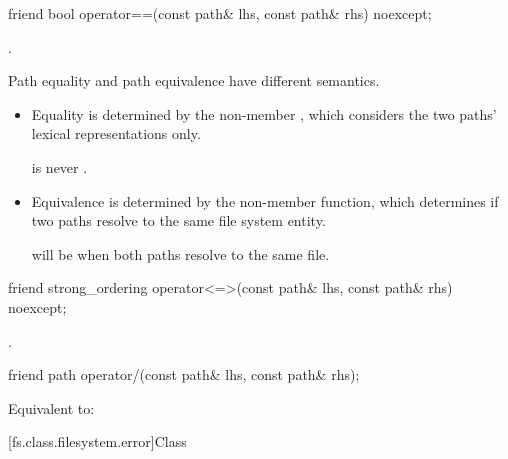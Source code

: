 %
\begin{itemdecl}
friend bool operator==(const path& lhs, const path& rhs) noexcept;
\end{itemdecl}

\begin{itemdescr}
\pnum
\returns
{}.

\pnum
\begin{note}
Path equality and path equivalence have different semantics.
\begin{itemize}
\item Equality is determined by the  non-member ,
which considers the two paths' lexical representations only.
\begin{example}
 is never .
\end{example}
\item Equivalence is determined by the  non-member function, which
determines if two paths resolve to the same file system entity.
\begin{example}
 will be  when both paths resolve to the same file.
\end{example}
\end{itemize}
\end{note}
\end{itemdescr}

%
\begin{itemdecl}
friend strong_ordering operator<=>(const path& lhs, const path& rhs) noexcept;
\end{itemdecl}

\begin{itemdescr}
\pnum
\returns
{}.
\end{itemdescr}

%
\begin{itemdecl}
friend path operator/(const path& lhs, const path& rhs);
\end{itemdecl}

\begin{itemdescr}
\pnum
\effects
Equivalent to: 
\end{itemdescr}

[fs.class.filesystem.error]{Class }

